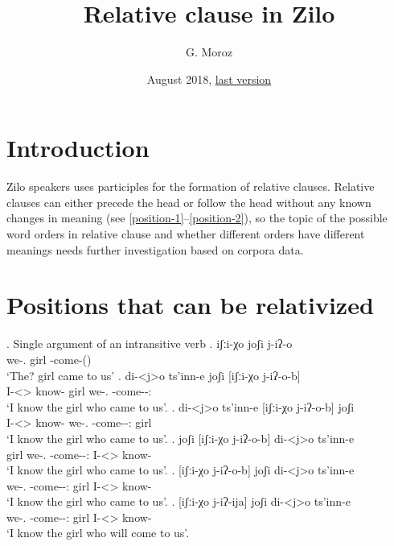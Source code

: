 
\title{\Large Relative clause in Zilo}
\author{G. Moroz}
\date{August 2018, \href{https://github.com/agricolamz/2018_Andi_relative_clause/raw/master/main.pdf}{last version}}
 
\maketitle

\section{Introduction}
Zilo speakers uses participles for the formation of relative clauses. Relative clauses can either precede the head or follow the head without any known changes in meaning (see \ref{position-1}--\ref{position-2}), so the topic of the possible word orders in relative clause and whether different orders have different meanings needs further investigation based on corpora data.

\section{Positions that can be relativized}

\ex. Single argument of an intransitive verb
	\ag. iʃːi-χo joʃi j-iʔ-o\\
		 {we-\Add.\Lat} {girl} {\F-come-\Pst(\Aor)}\\
		 \glt    `The? girl came to us'
	\bg. di-<j>o ts'inn-e joʃi [iʃːi-χo j-iʔ-o-b]\\
		 {I-<\F>\Aff} {know-\Hab} {girl} {we-\Add.\Lat} {\F-come-\Pst-\Ptcp:\Pst}\\
		 \glt    `I know the girl who came to us'. \label{position-1}
	\bg. di-<j>o ts'inn-e [iʃːi-χo j-iʔ-o-b] joʃi \\
		 {I-<\F>\Aff} {know-\Hab} {we-\Add.\Lat} {\F-come-\Pst-\Ptcp:\Pst} {girl}\\
		 \glt    `I know the girl who came to us'.
	\bg. joʃi  [iʃːi-χo j-iʔ-o-b] di-<j>o ts'inn-e \\
		  {girl}  {we-\Add.\Lat} {\F-come-\Pst-\Ptcp:\Pst} {I-<\F>\Aff} {know-\Hab}\\
		 \glt    `I know the girl who came to us'.
	\bg. [iʃːi-χo j-iʔ-o-b] joʃi di-<j>o ts'inn-e \\
		  {we-\Add.\Lat} {\F-come-\Pst-\Ptcp:\Pst} {girl} {I-<\F>\Aff} {know-\Hab}\\
		 \glt    `I know the girl who came to us'. \label{position-2}
	\bg. [iʃːi-χo j-iʔ-ija] joʃi di-<j>o ts'inn-e \\
		  {we-\Add.\Lat} {\F-come-\Pst-\Ptcp:\Pres} {girl} {I-<\F>\Aff} {know-\Hab}\\
		 \glt    `I know the girl who will come to us'. 


